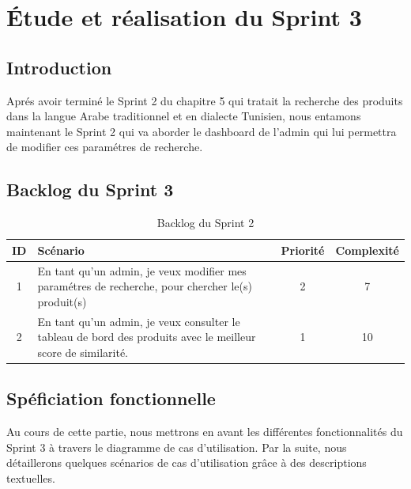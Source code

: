 \chapter{Étude et réalisation du Sprint 3}
\localtableofcontents
\newpage
\section{Introduction}
\noindent
Aprés avoir terminé le Sprint 2 du chapitre 5 qui tratait la recherche des produits dans la langue Arabe traditionnel et en dialecte Tunisien, nous entamons maintenant le Sprint 2 qui va aborder le dashboard de l'admin qui lui permettra de modifier ces paramétres de recherche.

\section{Backlog du Sprint 3}
\begin{table}[H]
	\centering

	\begin{tabularx}{\textwidth}{|c|X|c|c|}
		\hline
		\rowcolor{blue!20}
		\textbf{ID} & \textbf{Scénario}                                                                                            & \textbf{Priorité} & \textbf{Complexité} \\ \hline
		1           & En tant qu'un admin, je veux modifier mes paramétres de recherche, pour chercher le(s) produit(s)            & 2                 & 7                   \\ \hline

		2           & En tant qu'un admin, je veux consulter le tableau de bord des produits avec le meilleur score de similarité. & 1                 & 10                  \\ \hline
	\end{tabularx}
	\caption{Backlog du Sprint 2}
	\label{tab:sprint3}
\end{table}

\section{Spéficiation fonctionnelle}
\noindent
Au cours de cette partie, nous mettrons en avant les différentes fonctionnalités du
Sprint 3 à travers le diagramme de cas d'utilisation. Par la suite, nous détaillerons quelques
scénarios de cas d'utilisation grâce à des descriptions textuelles.

